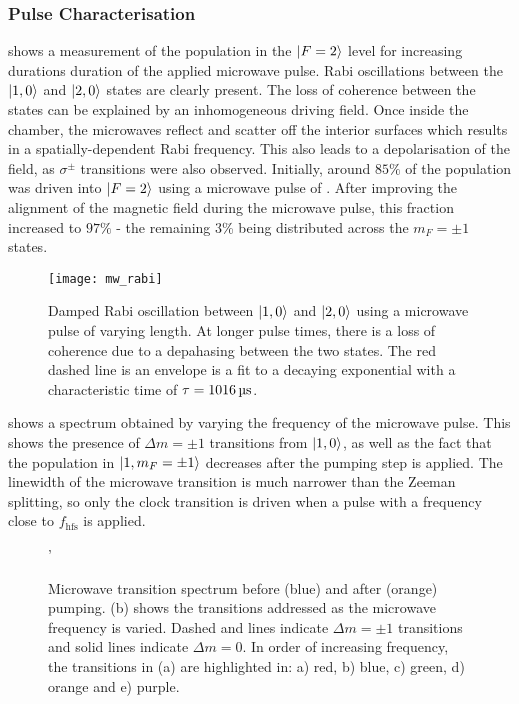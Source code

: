 \subsubsection{Pulse Characterisation}
 shows a measurement of the population in the \(\ket{F=2}\) level for increasing durations duration of the applied microwave pulse. Rabi oscillations between the \(\ket{1,0}\) and \(\ket{2,0}\) states are clearly present. The loss of coherence between the states can be explained by an inhomogeneous driving field. Once inside the chamber, the microwaves reflect and scatter off the interior surfaces which results in a spatially-dependent Rabi frequency. This also leads to a depolarisation of the field, as \(\sigma^{\pm}\) transitions were also observed. Initially, around \(85\%\) of the population was driven into \(\ket{F=2}\) using a microwave pulse of . After improving the alignment of the magnetic field during the microwave pulse, this fraction increased to \(97\%\) - the remaining 3\% being distributed across the \(m_F = \pm 1\) states.

\begin{figure}
    \centering
    \texttt{[image: mw\_rabi]}
    \caption[Microwave Rabi oscillation between \(\ket{1,0}\) and \(\ket{2,0}\)]{Damped Rabi oscillation between \(\ket{1,0}\) and \(\ket{2,0}\) using a microwave pulse of varying length. At longer pulse times, there is a loss of coherence due to a depahasing between the two states. The red dashed line is an envelope is a fit to a decaying exponential with a characteristic time of \(\tau = \sivalue{1016}{\micro\second}\).}
    \label{fig:mw_rabi}
\end{figure}
\par\noindent
{} shows a spectrum obtained by varying the frequency of the microwave pulse. This shows the presence of \(\Delta m = \pm 1 \) transitions from \(\ket{1,0}\), as well as the fact that the population in \(\ket{1,m_F=\pm 1}\) decreases after the  pumping step is applied. The linewidth of the microwave transition is much narrower than the Zeeman splitting, so only the clock transition is driven when a pulse with a frequency close to \(f_\text{hfs}\) is applied.
\begin{figure}
    \centering
    \def\svgwidth{\columnwidth}
    \subfloat[][]{\scalebox{0.7}{}\label{fig:microwave_spectrum}}
    \subfloat[][]{\scalebox{0.3}{\raisebox{3ex}{}}}
    \caption[Microwave transition spectrum]{Microwave transition spectrum before (blue) and after (orange)  pumping. (b) shows the transitions addressed as the microwave frequency is varied. Dashed and lines indicate \(\Delta m = \pm 1\) transitions and solid lines indicate \(\Delta m = 0\). In order of increasing frequency, the transitions in (a) are highlighted in: a) red, b) blue, c) green, d) orange and e) purple.} 
    \label{fig:microwave_data}'
\end{figure}

